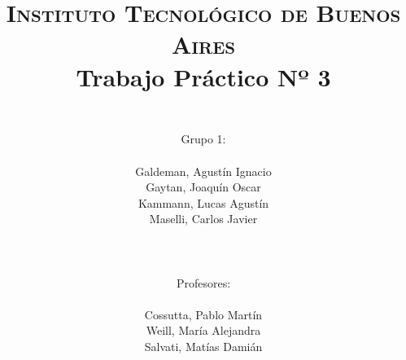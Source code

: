 



    \title{
        \normalfont \normalsize \textsc{Instituto Tecnol\'ogico de Buenos Aires} \\ [25pt]
        \huge Trabajo Pr\'actico Nº 3 \\
        \author{
            \\Grupo 1:\\\\Galdeman, Agust\'in Ignacio\\Gaytan, Joaqu\'in Oscar\\Kammann, Lucas Agust\'in\\Maselli, Carlos Javier\\ \\ \\ \\
            Profesores: \\\\ Cossutta, Pablo Mart\'in\\Weill, Mar\'ia Alejandra\\Salvati, Mat\'ias Dami\'an \\ \\ \\ 
        } 
    }

    \maketitle
    \newpage

    \tableofcontents

    \newpage
    
    \newpage
    
    \newpage
    
    \newpage
    

